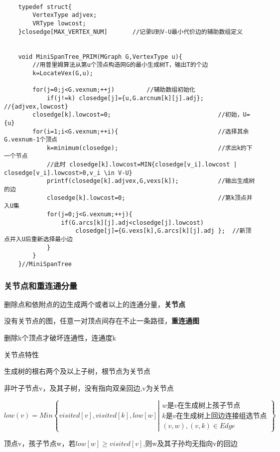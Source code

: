 \documentclass[UTF8]{ctexart}
\newcommand{\mt}[1]{\text{#1}}
\newcommand{\mb}[1]{\textbf{#1}}
\newcommand{\mfb}[1]{\left\{ #1\right\}}
\newcommand{\q}{\quad}
\newcommand{\fcza}[1] {
    \left |
        \begin{array}{llll} #1 \end{array}
    \right.
}
\begin{document}
\begin{lstlisting}[style=v1]

    typedef struct{
        VertexType adjvex;
        VRType lowcost;
    }closedge[MAX_VERTEX_NUM]       //记录U到V-U最小代价边的辅助数组定义


    void MiniSpanTree_PRIM(MGraph G,VertexType u){
        //用普里姆算法从第u个顶点构造网G的最小生成树T，输出T的个边
        k=LocateVex(G,u);

        for(j=0;j<G.vexnum;++j)         //辅助数组初始化   
            if(j!=k) closedge[j]={u,G.arcnum[k][j].adj};    //{adjvex,lowcost}
        closedge[k].lowcost=0;                              //初始，U={u}    
        for(i=1;i<G.vexnum;++i){                            //选择其余G.vexnum-1个顶点
            k=minimum(closedge);                            //求出k的下一个节点
            //此时 closedge[k].lowcost=MIN{closedge[v_i].lowcost | closedge[v_i].lowcost>0,v_i \in V-U}
            printf(closedge[k].adjvex,G,vexs[k]);           //输出生成树的边
            closedge[k].lowcost=0;                          //第k顶点并入U集
            for(j=0;j<G.vexnum;++j){
                if(G.arcs[k][j].adj<closedge[j].lowcost)
                    closedge[j]={G.vexs[k],G.arcs[k][j].adj };  //新顶点并入U后重新选择最小边
            }
        }
    }//MiniSpanTree

\end{lstlisting}
 
\subsubsection{关节点和重连通分量}

删除点和依附点的边生成两个或者以上的连通分量，\mb{关节点}

没有关节点的图，任意一对顶点间存在不止一条路径，\mb{重连通图}

删除k个顶点才破坏连通性，连通度k

关节点特性

    \q 生成树的根右两个及以上子树，根节点为关节点
    
    \q 非叶子节点v，及其子树，没有指向双亲回边,v为关节点

$low(v)=Min\mfb{visited[v],visited[k],low[w]  
\fcza{
    w\mt{是}v\mt{在生成树上孩子节点}\\
    k\mt{是}v\mt{在生成树上回边连接组选节点}\\
    (v,w),(v,k) \in Edge
}
}$

顶点v，孩子节点w，若$low[w] \geqslant visited[v]$,则w及其子孙均无指向v的回边
\end{document}
